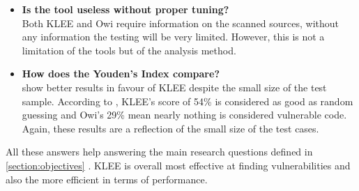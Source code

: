 \begin{itemize}
	\item \textbf{Is the tool useless without proper tuning?} \\
	Both KLEE and Owi require information on the scanned sources, without any information the testing will be very limited. However, this is not a limitation of the tools but of the analysis method.
	\item \textbf{How does the Youden's Index compare?} \\
	 show better results in favour of KLEE despite the small size of the test sample. According to \citet{owasp_benchmark_scoring}, KLEE's score of 54\% is considered as good as random guessing and Owi's 29\% mean nearly nothing is considered vulnerable code. Again, these results are a reflection of the small size of the test cases.
\end{itemize}

All these answers help answering the main research questions defined in \cref{section:objectives} .
KLEE is overall most effective at finding vulnerabilities and also the more efficient in terms of performance.